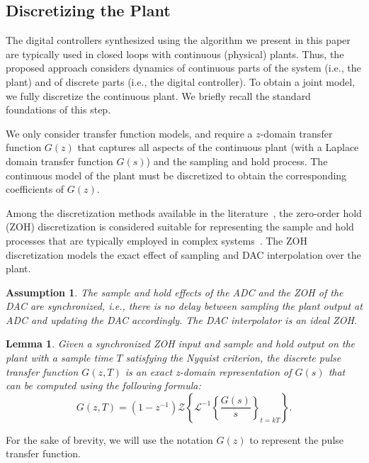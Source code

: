 \documentclass[final]{sig-alternate-05-2015}
\newcommand{\red}[1]{{\color{red}#1}}
\newtheorem{myassumption}{Assumption}
\newtheorem{mylemma}{Lemma}
\begin{document}
\subsection{Discretizing the Plant}
\label{ssec:SandH}

The digital controllers synthesized using the algorithm we present in this
paper are typically used in closed loops with continuous (physical) plants. 
Thus, the proposed approach considers dynamics of continuous parts of
the system (i.e., the plant) and of discrete parts (i.e., the digital
controller).  To obtain a joint model, we fully discretize the continuous
plant.  We briefly recall the standard foundations of this step.

We only consider transfer function models, and require a $z$-domain
transfer function $G(z)$ that captures all aspects of the continuous plant (with a
Laplace domain transfer function $G(s)$) and the sampling and hold process.
The continuous model of the plant must be discretized to obtain the corresponding 
coefficients of $G(z)$.


Among the discretization methods available in the
literature~\cite{Franklin15}, the zero-order hold (ZOH) discretization is
considered suitable for representing the sample and hold processes that are
typically employed in complex systems~\cite{istepanian2012digital}.  The ZOH
discretization models the exact effect of sampling and DAC interpolation
over the plant.

\begin{myassumption}
%
The sample and hold effects of the ADC and the ZOH of the DAC are synchronized,
i.e., there is no delay between sampling the plant output at ADC and
updating the DAC accordingly.  The DAC interpolator is an ideal ZOH. 
%
\end{myassumption}

\begin{mylemma}\cite{astrom1997computer}
%
Given a synchronized ZOH input and sample and hold output on the plant with
a sample time $T$ satisfying the Nyquist criterion, the discrete pulse
transfer function $G(z,T)$ is an exact z-domain representation of $G(s)$
that can be computed using the following formula:
%
\begin{equation}
\label{eq:pulsetf}
G(z,T) = %
(1-z^{-1})\mathcal{Z}\left\lbrace{\mathcal{L}^{-1}\left\lbrace{\frac{G(s)}{s}}\right\rbrace_{t=kT}}\right\rbrace.
\end{equation}
%
\end{mylemma}
%
For the sake of brevity, we will use the notation $G(z)$ to represent the
pulse transfer function.
\end{document}
